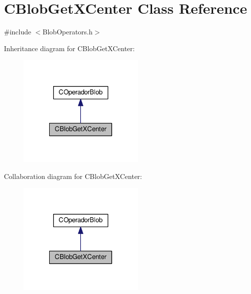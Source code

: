 \hypertarget{classCBlobGetXCenter}{\section{C\-Blob\-Get\-X\-Center Class Reference}
\label{classCBlobGetXCenter}
}


{\ttfamily \#include $<$Blob\-Operators.\-h$>$}



Inheritance diagram for C\-Blob\-Get\-X\-Center\-:\nopagebreak
\begin{figure}[H]
\begin{center}
\leavevmode
\includegraphics[width=174pt]{classCBlobGetXCenter__inherit__graph}
\end{center}
\end{figure}


Collaboration diagram for C\-Blob\-Get\-X\-Center\-:\nopagebreak
\begin{figure}[H]
\begin{center}
\leavevmode
\includegraphics[width=174pt]{classCBlobGetXCenter__coll__graph}
\end{center}
\end{figure}
